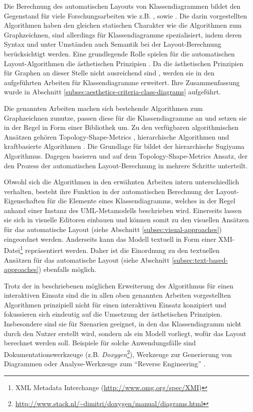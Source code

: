 Die Berechnung des automatischen Layouts von Klassendiagrammen bildet den Gegenstand für viele Forschungsarbeiten wie z.B. \cite{Eichelberger05Aesthetics}, \cite{Siebenhaller03Automatisches} sowie \cite{Eiglsperger04Automatic}. Die darin vorgestellten Algorithmen haben den gleichen statischen Charakter wie die Algorithmen zum Graphzeichnen, sind allerdings für Klassendiagramme spezialisiert, indem deren Syntax und unter Umständen auch Semantik bei der Layout-Berechnung berücksichtigt werden. Eine grundlegende Rolle spielen für die automatischen Layout-Algorithmen die ästhetischen Prinzipien \cite{Maier12A-Pattern-based}. Da die ästhetischen Prinzipien für Graphen an dieser Stelle nicht ausreichend sind \cite[S.79]{Eichelberger05Aesthetics}, werden sie in den aufgeführten Arbeiten für Klassendiagramme erweitert. Ihre Zusammenfassung wurde in Abschnitt \ref{subsec:aesthetics-criteria-class-diagrams} aufgeführt.

Die genannten Arbeiten machen sich bestehende Algorithmen zum Graphzeichnen zunutze, passen diese für die Klassendiagramme an und setzen sie in der Regel in Form einer Bibliothek um. Zu den verfügbaren algorithmischen Ansätzen gehören Topology-Shape-Metrics \cite[S.33]{Siebenhaller03Automatisches}, hierarchische Algorithmen und kraftbasierte Algorithmen \cite[S.32ff]{Eichelberger05Aesthetics}. Die Grundlage für \cite{Eichelberger05Aesthetics} bildet der hierarchische Sugiyama Algorithmus. Dagegen basieren \cite{Siebenhaller03Automatisches} und \cite{Eiglsperger04Automatic} auf dem Topology-Shape-Metrics Ansatz, der den Prozess der automatischen Layout-Berechnung in mehrere Schritte unterteilt.

Obwohl sich die Algorithmen in den erwähnten Arbeiten intern unterschiedlich verhalten, besteht ihre Funktion in der automatischen Berechnung der Layout-Eigenschaften für die Elemente eines Klassendiagramms, welches in der Regel anhand einer Instanz des UML-Metamodells beschrieben wird. Einerseits lassen sie sich in visuelle Editoren einbauen und können somit zu den visuellen Ansätzen für das automatische Layout (siehe Abschnitt \ref{subsec:visual-approaches}) eingeordnet werden. Anderseits kann das Modell textuell in Form einer XMI-Datei\footnote{XML Metadata Interchange (\url{http://www.omg.org/spec/XMI})} repräsentiert werden. Daher ist die Einordnung zu den textuellen Ansätzen für das automatische Layout (siehe Abschnitt \ref{subsec:text-based-approaches}) ebenfalls möglich.

Trotz der in \cite{Eiglsperger04Automatic} beschriebenen möglichen Erweiterung des Algorithmus für einen interaktiven Einsatz sind die in allen oben genannten Arbeiten vorgestellten Algorithmen prinzipiell nicht für einen interaktiven Einsatz konzipiert und fokussieren sich eindeutig auf die Umsetzung der ästhetischen Prinzipien. Insbesondere sind sie für Szenarien geeignet, in den das Klassendiagramm nicht durch den Nutzer erstellt wird, sondern als ein Modell vorliegt, wofür das Layout berechnet werden soll. Beispiele für solche Anwendungsfälle sind Dokumentationswerkzeuge (z.B. \textit{Doxygen}\footnote{\url{http://www.stack.nl/~dimitri/doxygen/manual/diagrams.html}}), Werkzeuge zur Generierung von Diagrammen oder Analyse-Werkzeuge zum \enquote{Reverse Engineering} \cite{Eiglsperger04Automatic}.

